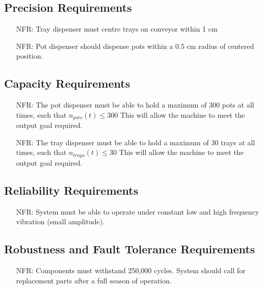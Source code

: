 \documentclass[12pt]{article}
\newcounter{nfrnum} %
\begin{document}
  \subsection{Precision Requirements}
  \noindent \begin{itemize}
  \item[NFR\refstepcounter{nfrnum}\thenfrnum \label{NFR_Precision1}:]
  Tray dispenser must centre trays on conveyor within 1 cm
  
  \item[NFR\refstepcounter{nfrnum}\thenfrnum \label{NFR_Precision2}:]
  Pot dispenser should dispense pots within a 0.5 cm radius of centered position.

  \end{itemize}


  \subsection{Capacity Requirements}
  \noindent \begin{itemize}
  \item[NFR\refstepcounter{nfrnum}\thenfrnum \label{NFR_Capacity1}:] {The pot dispenser must
  be able to hold a maximum of 300 pots at all times, such that 
  $n_{pots}(t)\le300$} 
  This will allow the machine to meet the output goal required.

  \item[NFR\refstepcounter{nfrnum}\thenfrnum \label{NFR_Capacity2}:] {The tray dispenser must
  be able to hold a maximum of 30 trays at all times, such that 
  $n_{trays}(t)\le30$} 
  This will allow the machine to meet the output goal required.

  \end{itemize}


  \subsection{Reliability Requirements}
  \noindent \begin{itemize}
  \item[NFR\refstepcounter{nfrnum}\thenfrnum \label{NFR_Realiability1}:]
  System must be able to operate under constant low and high frequency vibration (small amplitude).
  
  \end{itemize}


  \subsection{Robustness and Fault Tolerance Requirements}
  \noindent \begin{itemize}
  \item[NFR\refstepcounter{nfrnum}\thenfrnum \label{NFR_Robustness1}:]
  Components must withstand 250,000 cycles. System should call for replacement parts after a full season of operation.
  
  \end{itemize}
\end{document}
